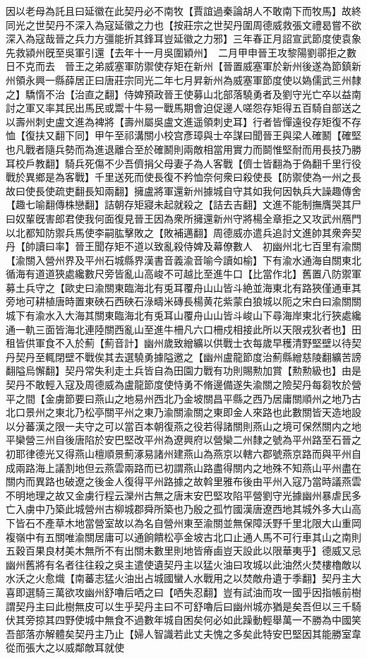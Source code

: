 因以老母為託且曰延徽在此契丹必不南牧【賈誼過秦論胡人不敢南下而牧馬】故終同光之世契丹不深入為寇延徽之力也【按莊宗之世契丹圍周德威救張文禮曷嘗不欲深入為寇哉晉之兵力方彊能折其鋒耳豈延徽之力邪】三年春正月詔宣武節度使袁象先救潁州旣至吳軍引還【去年十一月吳圍穎州】　二月甲申晉王攻黎陽劉鄩拒之數日不克而去　晉王之弟威塞軍防禦使存矩在新州【晉置威塞軍於新州後遂為節鎮新州領永興一縣薛居正曰唐莊宗同光二年七月昇新州為威塞軍節度使以媯儒武三州隸之】驕惰不治【治直之翻】侍婢預政晉王使募山北部落驍勇者及劉守光亡卒以益南討之軍又率其民出馬民或鬻十牛易一戰馬期會迫促邊人嗟怨存矩得五百騎自部送之以壽州刺史盧文進為裨將【壽州屬吳盧文進遥領刺史耳】行者皆憚遠役存矩復不存恤【復扶又翻下同】甲午至祁溝關小校宫彥璋與士卒謀曰聞晉王與梁人確鬭【確堅也凡戰者隨兵勢而為進退離合至於確鬭則兩敵相當用實力而鬬惟堅耐而用長技乃勝耳校戶教翻】騎兵死傷不少吾儕捐父母妻子為人客戰【儕士皆翻為于偽翻千里行役戰於異鄉是為客戰】千里送死而使長復不矜恤奈何衆曰殺使長【防禦使為一州之長故曰使長使疏吏翻長知兩翻】擁盧將軍還新州據城自守其如我何因執兵大譟趣傳舍【趣七喻翻傳株戀翻】詰朝存矩寢未起就殺之【詰去吉翻】文進不能制撫膺哭其尸曰奴輩旣害郎君使我何面復見晉王因為衆所擁還新州守將楊全章拒之又攻武州鴈門以北都知防禦兵馬使李嗣肱擊敗之【敗補邁翻】周德威亦遣兵追討文進帥其衆奔契丹【帥讀曰率】晉王聞存矩不道以致亂殺侍婢及幕僚數人　初幽州北七百里有渝關【渝關入營州界及平州石城縣界漢書音義渝音喻今讀如榆】下有渝水通海自關東北循海有道道狹處纔數尺旁皆亂山高峻不可越比至進牛口【比當作北】舊置八防禦軍募土兵守之【歐史曰渝關東臨海北有兎耳覆舟山山皆斗絶並海東北有路狹僅通車其旁地可耕植唐時置東硤石西硤石淥疇米磚長楊黄花紫蒙白狼城以阨之宋白曰渝關關城下有渝水入大海其關東臨海北有兎耳山覆舟山山皆斗峻山下尋海岸東北行狹處纔通一軌三面皆海北連陸關西亂山至進牛柵凡六口柵戍相接此所以天限戎狄者也】田租皆供軍食不入於薊【薊音計】幽州歲致繒纊以供戰士衣每歲早穫清野堅壁以待契丹契丹至輒閉壁不戰俟其去選驍勇據隘邀之【幽州盧龍節度治薊縣繒慈陵翻纊苦謗翻隘烏懈翻】契丹常失利走土兵皆自為田園力戰有功則賜勲加賞【勲勲級也】由是契丹不敢輕入寇及周德威為盧龍節度使恃勇不脩邊備遂失渝關之險契丹每芻牧於營平之間【金虜節要曰燕山之地易州西北乃金坡關昌平縣之西乃居庸關順州之地乃古北口景州之東北乃松亭關平州之東乃渝關渝關之東即金人來路也此數關皆天造地設以分蕃漢之限一夫守之可以當百本朝復燕之役若得諸關則燕山之境可保然關内之地平欒營三州自後唐陷於安巴堅改平州為遼興府以營欒二州隸之號為平州路至石晉之初耶律德光又得燕山檀順景薊涿易諸州建燕山為燕京以轄六郡號燕京路而與平州自成兩路海上議割地但云燕雲兩路而已初謂燕山路盡得關内之地殊不知燕山平州盡在關内而異路也破遼之後金人復得平州路據之故斡里雅布後由平州入寇乃當時議燕雲不明地理之故又金虜行程云灤州古無之唐末安巴堅攻陷平營劉守光據幽州暴虐民多亡入虜中乃築此城營州古柳城郡舜所築也乃殷之孤竹國漢唐遼西地其城外多大山高下皆石不產草木地當營室故以為名自營州東至渝關並無保障沃野千里北限大山重岡複嶺中有五關唯渝關居庸可以通餉饋松亭金坡古北口止通人馬不可行車其山之南則五穀百果良材美木無所不有出關未數里則地皆瘠鹵豈天設此以限華夷乎】德威又忌幽州舊將有名者往往殺之吳主遣使遺契丹主以猛火油曰攻城以此油然火焚樓櫓敵以水沃之火愈熾【南蕃志猛火油出占城國蠻人水戰用之以焚敵舟遺于季翻】契丹主大喜即選騎三萬欲攻幽州舒嚕后哂之曰【哂失忍翻】豈有試油而攻一國乎因指帳前樹謂契丹主曰此樹無皮可以生乎契丹主曰不可舒嚕后曰幽州城亦猶是矣吾但以三千騎伏其旁掠其四野使城中無食不過數年城自困矣何必如此躁動輕舉萬一不勝為中國笑吾部落亦解體矣契丹主乃止【婦人智識若此丈夫愧之多矣此特安巴堅因其能勝室韋從而張大之以威鄰敵耳就使